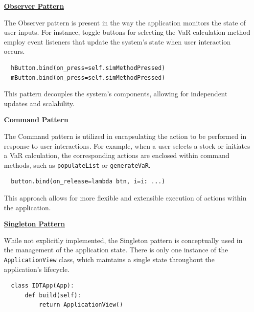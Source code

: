 \documentclass{article}
\begin{document}
\newpage
\underline{\textbf{Observer Pattern}}\\\vspace{0.3cm}

The Observer pattern is present in the way the application monitors the state of user inputs. For instance, toggle buttons for selecting the VaR calculation method employ event listeners that update the system's state when user interaction occurs.

\begin{verbatim}
  hButton.bind(on_press=self.simMethodPressed)
  mButton.bind(on_press=self.simMethodPressed)
\end{verbatim}

This pattern decouples the system's components, allowing for independent updates and scalability.\\\vspace{0.3cm}

\underline{\textbf{Command Pattern}}\\\vspace{0.3cm}

The Command pattern is utilized in encapsulating the action to be performed in response to user interactions. For example, when a user selects a stock or initiates a VaR calculation, the corresponding actions are enclosed within command methods, such as \texttt{populateList} or \texttt{generateVaR}.

\begin{verbatim}
  button.bind(on_release=lambda btn, i=i: ...)
\end{verbatim}

This approach allows for more flexible and extensible execution of actions within the application.\\\vspace{0.3cm}

\underline{\textbf{Singleton Pattern}}\\\vspace{0.3cm}

While not explicitly implemented, the Singleton pattern is conceptually used in the management of the application state. There is only one instance of the \texttt{ApplicationView} class, which maintains a single state throughout the application's lifecycle.

\begin{verbatim}
  class IDTApp(App):
      def build(self):
          return ApplicationView()
\end{verbatim}
\end{document}
